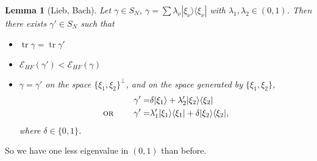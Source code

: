 \documentclass[11pt]{amsart}
\newtheorem{lem}{Lemma}
\theoremstyle{definition}
\theoremstyle{definition}
\theoremstyle{definition}
\numberwithin{equation}{section}
\begin{document}
\begin{lem}[Lieb, Bach]
Let $\gamma\in S_N$, $\gamma=\sum \lambda_\nu|\xi_\nu\rangle\langle\xi_\nu|$ with $\lambda_1,\lambda_2\in (0,1)$. Then there exists $\gamma'\in S_N$ such that
\begin{itemize}
\item $\operatorname{tr}\gamma=\operatorname{tr}\gamma'$
\item $\mathcal{E}_{HF}(\gamma')<\mathcal{E}_{HF}(\gamma)$
\item $\gamma=\gamma'$ on the space $\{\xi_1,\xi_2\}^\perp$, and on the space generated by $\{\xi_1,\xi_2\}$,
\begin{align*}
\gamma'=&\delta |\xi_1\rangle+\lambda_2'|\xi_2\rangle\langle\xi_2|\\
\text{\textsc{or} }\qquad\gamma'=&\lambda_1'|\xi_1\rangle\langle\xi_1|+\delta|\xi_2\rangle\langle\xi_2|,
\end{align*}
where $\delta\in\{0,1\}$.
\end{itemize}
\end{lem}
So we have one less eigenvalue in $(0,1)$ than before.
\end{document}
